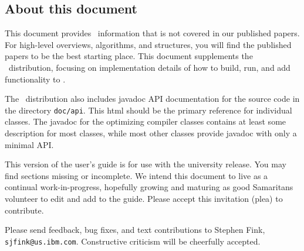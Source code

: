 \subsection {About this document}

This document provides \jp\ information that is not covered in
our published papers.  For high-level overviews, algorithms, and
structures, you will find the published papers to be the best starting
place. This document supplements
the \jp\ distribution, focusing on implementation
details of how to build, run, and add functionality to \jp.

The \jp\ distribution also includes javadoc API documentation for the 
source code in the directory {\tt doc/api}.  This html should be the
primary reference for individual classes.  The javadoc for the optimizing
compiler classes contains at least some description for most classes,
while most other classes provide javadoc with only a minimal API.

This version of the user's guide is for use with the university
release.  You may find sections missing or incomplete. We intend this
document to live as a continual work-in-progress, hopefully growing
and maturing as good Samaritans volunteer to edit and add to the
guide.  Please accept this invitation (plea) to contribute.

Please send feedback, bug fixes, and text contributions to Stephen Fink,
{\tt sjfink@us.ibm.com}.  Constructive criticism will be cheerfully 
accepted. 

